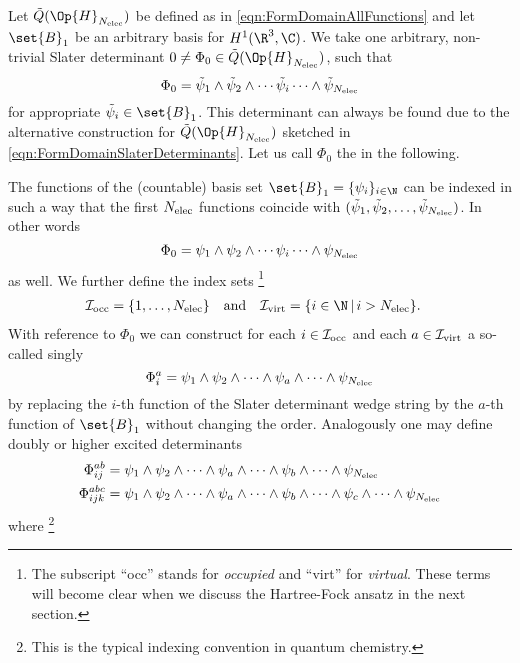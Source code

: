 \begin{rem}
	\label{rem:Determinants}
	Let $\tilde{Q}(\Op{H}_{\Nelec})$ be defined as in \eqref{eqn:FormDomainAllFunctions}
	and let $\set{B}_1$ be an arbitrary basis for $H^1(\R^3, \C)$.
	We take one arbitrary, non-trivial Slater determinant
	$0 \neq \Phi_0 \in \tilde{Q}(\Op{H}_{\Nelec})$,
	such that
	\[
		\Phi_0 = \tilde{\psi}_1 \wedge \tilde{\psi}_2 \wedge \cdots \tilde{\psi}_i \cdots \wedge \tilde{\psi}_{N_\text{elec}}
	\]
	for appropriate $\tilde{\psi}_i \in \set{B}_1$.
	This determinant can always be found due to the alternative
	construction for $\tilde{Q}(\Op{H}_{\Nelec})$ sketched
	in \eqref{eqn:FormDomainSlaterDeterminants}.
	Let us call $\Phi_0$ the 
	in the following.

	The functions of the (countable) basis set $\set{B}_1 = \{\psi_i\}_{i \in \N}$
	can be indexed in such a way
	that the first $N_\text{elec}$ functions coincide with $(\tilde{\psi}_1, \tilde{\psi}_2, \ldots, \tilde{\psi}_{N_\text{elec}})$.
	In other words
	\[
		\Phi_0 = \psi_1 \wedge \psi_2 \wedge \cdots \psi_i \cdots \wedge \psi_{N_\text{elec}}
	\]
	as well.
	We further define the index sets%
	\footnote{%
		The subscript ``occ'' stands for \textit{occupied}
		and ``virt'' for \textit{virtual}.
		These terms will become clear when we discuss the Hartree-Fock ansatz
		in the next section.
	}
	\begin{align*}
		\Iocc &= \{1, \ldots, \Nelec\}
		&&\text{and} &
		\Ivirt &= \{ i \in \N \, | \, i > \Nelec \}.
	\end{align*}
	With reference to $\Phi_0$ we can construct
	for each $i \in \mathcal{I}_\text{occ}$ and each $a \in \mathcal{I}_\text{virt}$
	a so-called singly 
	\[
		\Phi_i^a = \psi_1 \wedge \psi_2 \wedge \cdots \wedge \psi_a \wedge
			\cdots \wedge \psi_{N_\text{elec}}
	\]
	by replacing the $i$-th function of the Slater determinant
	wedge string
	by the $a$-th function of $\set{B}_1$
	without changing the order.
	Analogously one may define doubly or higher excited determinants
	\begin{align*}
		\Phi_{ij}^{ab} &= \psi_1 \wedge \psi_2 \wedge \cdots \wedge \psi_a \wedge
			\cdots \wedge \psi_b
			\wedge \cdots \wedge \psi_{N_\text{elec}} \\
		\Phi_{ijk}^{abc} &= \psi_1 \wedge \psi_2 \wedge \cdots \wedge \psi_a \wedge
			\cdots \wedge \psi_b \wedge
			\cdots \wedge \psi_c \wedge \cdots \wedge \psi_{N_\text{elec}}
	\end{align*}
	where%
	\footnote{%
		This is the typical indexing convention in quantum chemistry.
}
\end{rem}
